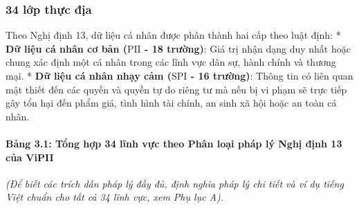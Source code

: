 \documentclass[
  11pt,
  a4paper,
]{article}
\begin{document}
\subsubsection{34 lớp thực địa}\label{lux1edbp-thux1ef1c-ux111ux1ecba}

Theo Nghị định 13, dữ liệu cá nhân được phân thành hai cấp theo luật
định: * \textbf{Dữ liệu cá nhân cơ bản (\(\text{PII}\) - 18 trường)}:
Giá trị nhận dạng duy nhất hoặc chung xác định một cá nhân trong các
lĩnh vực dân sự, hành chính và thương mại. * \textbf{Dữ liệu cá nhân
nhạy cảm (\(\text{SPI}\) - 16 trường)}: Thông tin có liên quan mật thiết
đến các quyền và quyền tự do riêng tư mà nếu bị vi phạm sẽ trực tiếp gây
tổn hại đến phẩm giá, tình hình tài chính, an sinh xã hội hoặc an toàn
cá nhân.

\paragraph{Bảng 3.1: Tổng hợp 34 lĩnh vực theo Phân loại pháp lý Nghị
định 13 của
ViPII}\label{bux1ea3ng-3.1-tux1ed5ng-hux1ee3p-34-lux129nh-vux1ef1c-theo-phuxe2n-loux1ea1i-phuxe1p-luxfd-nghux1ecb-ux111ux1ecbnh-13-cux1ee7a-vipii}

\emph{(Để biết các trích dẫn pháp lý đầy đủ, định nghĩa pháp lý chi tiết
và ví dụ tiếng Việt chuẩn cho tất cả 34 lĩnh vực, xem Phụ lục A).}
\end{document}
